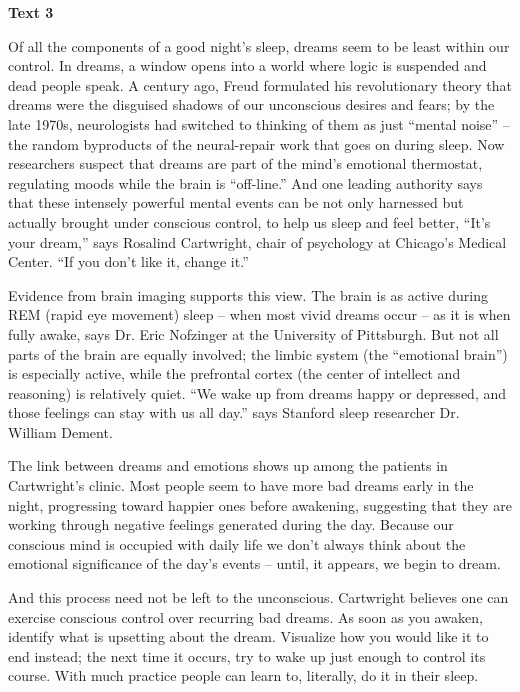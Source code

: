\begin{center}\textbf{Text 3}\end{center}

\qquad Of all the components of a good night's sleep, dreams seem to be least within our control. In dreams, a window opens into a world where logic is suspended and dead people speak. A century ago, Freud formulated his revolutionary theory that dreams were the disguised shadows of our unconscious desires and fears; by the late 1970s, neurologists had switched to thinking of them as just ``mental noise'' -- the random byproducts of the neural-repair work that goes on during sleep. Now researchers suspect that dreams are part of the mind's emotional thermostat, regulating moods while the brain is ``off-line.'' And one leading authority says that these intensely powerful mental events can be not only harnessed but actually brought under conscious control, to help us sleep and feel better, ``It's your dream,'' says Rosalind Cartwright, chair of psychology at Chicago's Medical Center. ``If you don't like it, change it.''

\qquad Evidence from brain imaging supports this view. The brain is as active during REM (rapid eye movement) sleep -- when most vivid dreams occur -- as it is when fully awake, says Dr. Eric Nofzinger at the University of Pittsburgh. But not all parts of the brain are equally involved; the limbic system (the ``emotional brain'') is especially active, while the prefrontal cortex (the center of intellect and reasoning) is relatively quiet. ``We wake up from dreams happy or depressed, and those feelings can stay with us all day.'' says Stanford sleep researcher Dr. William Dement.

\qquad The link between dreams and emotions shows up among the patients in Cartwright's clinic. Most people seem to have more bad dreams early in the night, progressing toward happier ones before awakening, suggesting that they are working through negative feelings generated during the day. Because our conscious mind is occupied with daily life we don't always think about the emotional significance of the day's events -- until, it appears, we begin to dream.

\qquad And this process need not be left to the unconscious. Cartwright believes one can exercise conscious control over recurring bad dreams. As soon as you awaken, identify what is upsetting about the dream. Visualize how you would like it to end instead; the next time it occurs, try to wake up just enough to control its course. With much practice people can learn to, literally, do it in their sleep.

